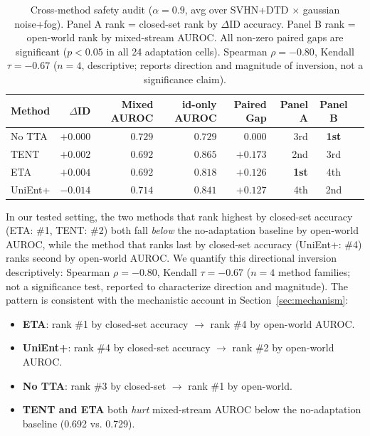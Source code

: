 \begin{table}[t]
\centering\small
\caption{%
  Cross-method safety audit ($\alpha = 0.9$, avg over SVHN+DTD $\times$ gaussian noise+fog).
  Panel A rank = closed-set rank by $\Delta$ID accuracy.
  Panel B rank = open-world rank by mixed-stream AUROC.
  All non-zero paired gaps are significant ($p < 0.05$ in all 24 adaptation cells).
  Spearman $\rho = -0.80$, Kendall $\tau = -0.67$ ($n{=}4$, descriptive; reports direction and magnitude of inversion, not a significance claim).
}
\label{tab:audit}
\begin{tabular}{lrrrrrcc}
\toprule
Method & $\Delta$ID & Mixed AUROC & id-only AUROC & Paired Gap & Panel A & Panel B \\
\midrule
No TTA   & $+0.000$ & $0.729$ & $0.729$ & $0.000$ & 3rd & \textbf{1st} \\
TENT     & $+0.002$ & $0.692$ & $0.865$ & $+0.173$ & 2nd & 3rd \\
ETA      & $+0.004$ & $0.692$ & $0.818$ & $+0.126$ & \textbf{1st} & 4th \\
UniEnt+  & $-0.014$ & $0.714$ & $0.841$ & $+0.127$ & 4th & 2nd \\
\bottomrule
\end{tabular}
\end{table}

In our tested setting, the two methods that rank highest by closed-set accuracy (ETA: \#1, TENT: \#2) both fall \emph{below} the no-adaptation baseline by open-world AUROC, while the method that ranks last by closed-set accuracy (UniEnt+: \#4) ranks second by open-world AUROC.
We quantify this directional inversion descriptively: Spearman $\rho = -0.80$, Kendall $\tau = -0.67$ ($n{=}4$ method families; not a significance test, reported to characterize direction and magnitude).
The pattern is consistent with the mechanistic account in Section~\ref{sec:mechanism}:
\begin{itemize}[leftmargin=*,topsep=2pt,itemsep=1pt]
  \item \textbf{ETA}: rank \#1 by closed-set accuracy $\to$ rank \#4 by open-world AUROC.
  \item \textbf{UniEnt+}: rank \#4 by closed-set accuracy $\to$ rank \#2 by open-world AUROC.
  \item \textbf{No TTA}: rank \#3 by closed-set $\to$ rank \#1 by open-world.
  \item \textbf{TENT and ETA} both \emph{hurt} mixed-stream AUROC below the no-adaptation baseline (0.692 vs. 0.729).
\end{itemize}

